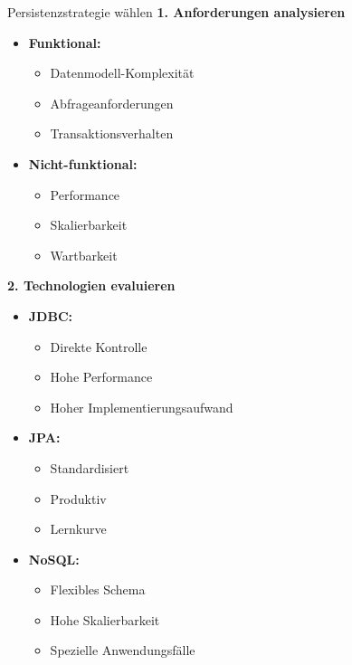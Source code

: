 \begin{KR}{Persistenzstrategie wählen}
\textbf{1. Anforderungen analysieren}
\begin{itemize}
    \item \textbf{Funktional:}
    \begin{itemize}
        \item Datenmodell-Komplexität
        \item Abfrageanforderungen
        \item Transaktionsverhalten
    \end{itemize}
    \item \textbf{Nicht-funktional:}
    \begin{itemize}
        \item Performance
        \item Skalierbarkeit
        \item Wartbarkeit
    \end{itemize}
\end{itemize}

\textbf{2. Technologien evaluieren}
\begin{itemize}
    \item \textbf{JDBC:}
    \begin{itemize}
        \item Direkte Kontrolle
        \item Hohe Performance
        \item Hoher Implementierungsaufwand
    \end{itemize}
    \item \textbf{JPA:}
    \begin{itemize}
        \item Standardisiert
        \item Produktiv
        \item Lernkurve
    \end{itemize}
    \item \textbf{NoSQL:}
    \begin{itemize}
        \item Flexibles Schema
        \item Hohe Skalierbarkeit
        \item Spezielle Anwendungsfälle
    \end{itemize}
\end{itemize}
\end{KR}

